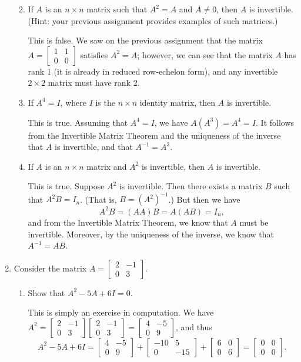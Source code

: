 \documentclass[letterpaper,12pt,reqno]{amsart}
\newcommand{\bbm}{\begin{bmatrix}}
\newcommand{\ebm}{\end{bmatrix}}
\begin{document}
\begin{enumerate}
\begin{enumerate}
\bigskip

 \item If $A$ is an $n\times n$ matrix such that $A^2=A$ and $A\neq 0$, then $A$ is invertible. (Hint: your previous assignment provides examples of such matrices.)

\bigskip

This is false. We saw on the previous assignment that the matrix $A = \bbm 1&1\\0&0\ebm$ satisfies $A^2=A$; however, we can see that the matrix $A$ has rank 1 (it is already in reduced row-echelon form), and any invertible $2\times 2$ matrix must have rank 2.

\bigskip

 \item If $A^4=I$, where $I$ is the $n\times n$ identity matrix, then $A$ is invertible.

\bigskip

This is true. Assuming that $A^4=I$, we have $A(A^3) = A^4 = I$. It follows from the Invertible Matrix Theorem and the uniqueness of the inverse that $A$ is invertible, and that $A^{-1} = A^3$.

\bigskip


 \item If $A$ is an $n\times n$ matrix and $A^2$ is invertible, then $A$ is invertible.

\bigskip

This is true. Suppose $A^2$ is invertible. Then there exists a matrix $B$ such that $A^2B = I_n$. (That is, $B = (A^2)^{-1}$.) But then we have
\[
 A^2B = (AA)B = A(AB) = I_n,
\]
and from the Invertible Matrix Theorem, we know that $A$ must be invertible. Moreover, by the uniqueness of the inverse, we know that $A^{-1} = AB$.
\end{enumerate}

\bigskip

\bigskip

\item Consider the matrix $A = \bbm 2&-1\\0&3\ebm$.

\medskip

\begin{enumerate}
 \item Show that $A^2-5A+6I=0$.

\bigskip

This is simply an exercise in computation. We have $A^2 = \bbm 2&-1\\0&3\ebm\bbm 2&-1\\0&3\ebm=\bbm 4&-5\\0&9\ebm$, and thus
\[
 A^2-5A+6I = \bbm 4&-5\\0&9\ebm + \bbm -10&5\\0&-15\ebm +\bbm 6&0\\0&6\ebm = \bbm 0&0\\0&0\ebm.
\]


\end{enumerate}
\end{enumerate}
\end{document}
